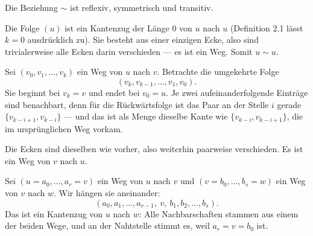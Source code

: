 \begin{merksatz}
Die Beziehung $\sim$ ist reflexiv, symmetrisch und transitiv.
\end{merksatz}

\begin{merksatz}
Die Folge $(u)$ ist ein Kantenzug der Länge $0$ von $u$ nach $u$ (Definition 2.1 lässt $k=0$ ausdrücklich zu). Sie besteht aus einer einzigen Ecke, also sind trivialerweise alle Ecken darin verschieden --- es ist ein Weg. Somit $u \sim u$.

\begin{center}
\begin{minipage}{0.88\textwidth}
\end{minipage}
\end{center}

Sei $(v_0, v_1, \ldots, v_k)$ ein Weg von $u$ nach $v$. Betrachte die umgekehrte Folge
\[ (v_k, v_{k-1}, \ldots, v_1, v_0) . \]
Sie beginnt bei $v_k = v$ und endet bei $v_0 = u$. Je zwei aufeinanderfolgende Einträge sind benachbart, denn für die Rückwärtsfolge ist das Paar an der Stelle $i$ gerade $\{v_{k-i+1}, v_{k-i}\}$ --- und das ist als Menge dieselbe Kante wie $\{v_{k-i}, v_{k-i+1}\}$, die im ursprünglichen Weg vorkam.

Die Ecken sind dieselben wie vorher, also weiterhin paarweise verschieden. Es ist ein Weg von $v$ nach $u$.

\begin{center}
\begin{minipage}{0.88\textwidth}
\end{minipage}
\end{center}

Sei $(u = a_0, \ldots, a_r = v)$ ein Weg von $u$ nach $v$ und $(v = b_0, \ldots, b_s = w)$ ein Weg von $v$ nach $w$. Wir hängen sie aneinander:
\[ (a_0, a_1, \ldots, a_{r-1},\ v,\ b_1, b_2, \ldots, b_s) . \]
Das ist ein Kantenzug von $u$ nach $w$: Alle Nachbarschaften stammen aus einem der beiden Wege, und an der Nahtstelle stimmt es, weil $a_r = v = b_0$ ist.


\end{merksatz}
